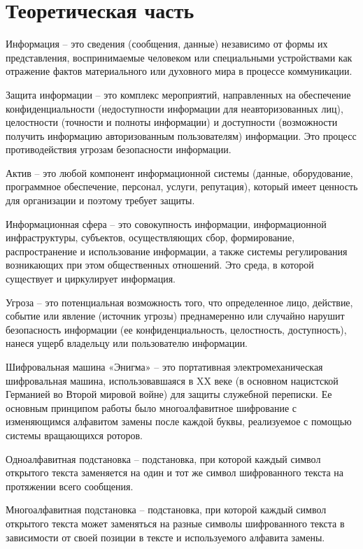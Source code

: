 \chapter{Теоретическая часть}

Информация -- это сведения (сообщения, данные) независимо от формы их представления, воспринимаемые человеком или специальными устройствами как отражение фактов материального или духовного мира в процессе коммуникации.

Защита информации -- это комплекс мероприятий, направленных на обеспечение конфиденциальности (недоступности информации для неавторизованных лиц), целостности (точности и полноты информации) и доступности (возможности получить информацию авторизованным пользователям) информации. Это процесс противодействия угрозам безопасности информации.

Актив -- это любой компонент информационной системы (данные, оборудование, программное обеспечение, персонал, услуги, репутация), который имеет ценность для организации и поэтому требует защиты.

Информационная сфера -- это совокупность информации, информационной инфраструктуры, субъектов, осуществляющих сбор, формирование, распространение и использование информации, а также системы регулирования возникающих при этом общественных отношений. Это среда, в которой существует и циркулирует информация.

Угроза -- это потенциальная возможность того, что определенное лицо, действие, событие или явление (источник угрозы) преднамеренно или случайно нарушит безопасность информации (ее конфиденциальность, целостность, доступность), нанеся ущерб владельцу или пользователю информации.

Шифровальная машина «Энигма» -- это портативная электромеханическая шифровальная машина, использовавшаяся в XX веке (в основном нацистской Германией во Второй мировой войне) для защиты служебной переписки. Ее основным принципом работы было многоалфавитное шифрование с изменяющимся алфавитом замены после каждой буквы, реализуемое с помощью системы вращающихся роторов.

Одноалфавитная подстановка -- подстановка, при которой каждый символ открытого текста заменяется на один и тот же символ шифрованного текста на протяжении всего сообщения.

Многоалфавитная подстановка -- подстановка, при которой каждый символ открытого текста может заменяться на разные символы шифрованного текста в зависимости от своей позиции в тексте и используемого алфавита замены.

